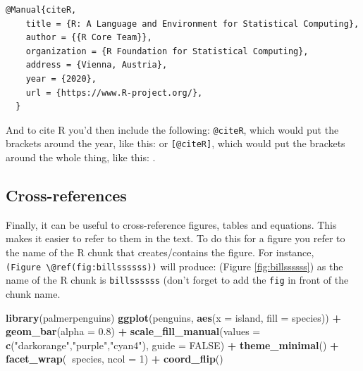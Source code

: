 \documentclass[
]{book}
\newenvironment{Shaded}{\begin{snugshade}}{\end{snugshade}}
\newcommand{\DataTypeTok}[1]{\textcolor[rgb]{0.13,0.29,0.53}{#1}}
\newcommand{\DecValTok}[1]{\textcolor[rgb]{0.00,0.00,0.81}{#1}}
\newcommand{\FloatTok}[1]{\textcolor[rgb]{0.00,0.00,0.81}{#1}}
\newcommand{\KeywordTok}[1]{\textcolor[rgb]{0.13,0.29,0.53}{\textbf{#1}}}
\newcommand{\NormalTok}[1]{#1}
\newcommand{\OperatorTok}[1]{\textcolor[rgb]{0.81,0.36,0.00}{\textbf{#1}}}
\newcommand{\OtherTok}[1]{\textcolor[rgb]{0.56,0.35,0.01}{#1}}
\newcommand{\StringTok}[1]{\textcolor[rgb]{0.31,0.60,0.02}{#1}}
\begin{document}
\begin{verbatim}
@Manual{citeR,
    title = {R: A Language and Environment for Statistical Computing},
    author = {{R Core Team}},
    organization = {R Foundation for Statistical Computing},
    address = {Vienna, Austria},
    year = {2020},
    url = {https://www.R-project.org/},
  }
\end{verbatim}

And to cite R you'd then include the following: \texttt{@citeR}, which would put the brackets around the year, like this: \citet{citeR} or \texttt{{[}@citeR{]}}, which would put the brackets around the whole thing, like this: \citep{citeR}.

\hypertarget{cross-references}{%
\subsection{Cross-references}\label{cross-references}}

Finally, it can be useful to cross-reference figures, tables and equations. This makes it easier to refer to them in the text. To do this for a figure you refer to the name of the R chunk that creates/contains the figure. For instance, \texttt{(Figure\ \textbackslash{}@ref(fig:billssssss))} will produce: (Figure \ref{fig:billssssss}) as the name of the R chunk is \texttt{billssssss} (don't forget to add the \texttt{fig} in front of the chunk name.

\begin{Shaded}
\begin{Highlighting}[]
\KeywordTok{library}\NormalTok{(palmerpenguins)}
\KeywordTok{ggplot}\NormalTok{(penguins, }\KeywordTok{aes}\NormalTok{(}\DataTypeTok{x =}\NormalTok{ island, }\DataTypeTok{fill =}\NormalTok{ species)) }\OperatorTok{+}
\StringTok{  }\KeywordTok{geom_bar}\NormalTok{(}\DataTypeTok{alpha =} \FloatTok{0.8}\NormalTok{) }\OperatorTok{+}
\StringTok{  }\KeywordTok{scale_fill_manual}\NormalTok{(}\DataTypeTok{values =} \KeywordTok{c}\NormalTok{(}\StringTok{"darkorange"}\NormalTok{,}\StringTok{"purple"}\NormalTok{,}\StringTok{"cyan4"}\NormalTok{),}
                    \DataTypeTok{guide =} \OtherTok{FALSE}\NormalTok{) }\OperatorTok{+}
\StringTok{  }\KeywordTok{theme_minimal}\NormalTok{() }\OperatorTok{+}
\StringTok{  }\KeywordTok{facet_wrap}\NormalTok{(}\OperatorTok{~}\NormalTok{species, }\DataTypeTok{ncol =} \DecValTok{1}\NormalTok{) }\OperatorTok{+}
\StringTok{  }\KeywordTok{coord_flip}\NormalTok{()}
\end{Highlighting}
\end{Shaded}
\end{document}

